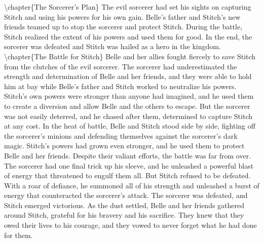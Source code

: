 \documentclass{book}%
\begin{document}
\textbackslash{}chapter\{The Sorcerer's Plan\}\newline%
\newline%
The evil sorcerer had set his sights on capturing Stitch and using his powers for his own gain. Belle's father and Stitch's new friends teamed up to stop the sorcerer and protect Stitch. During the battle, Stitch realized the extent of his powers and used them for good. In the end, the sorcerer was defeated and Stitch was hailed as a hero in the kingdom.%
\textbackslash{}chapter\{The Battle for Stitch\}\newline%
\newline%
Belle and her allies fought fiercely to save Stitch from the clutches of the evil sorcerer. The sorcerer had underestimated the strength and determination of Belle and her friends, and they were able to hold him at bay while Belle's father and Stitch worked to neutralize his powers.\newline%
\newline%
Stitch's own powers were stronger than anyone had imagined, and he used them to create a diversion and allow Belle and the others to escape. But the sorcerer was not easily deterred, and he chased after them, determined to capture Stitch at any cost.\newline%
\newline%
In the heat of battle, Belle and Stitch stood side by side, fighting off the sorcerer's minions and defending themselves against the sorcerer's dark magic. Stitch's powers had grown even stronger, and he used them to protect Belle and her friends.\newline%
\newline%
Despite their valiant efforts, the battle was far from over. The sorcerer had one final trick up his sleeve, and he unleashed a powerful blast of energy that threatened to engulf them all.\newline%
\newline%
But Stitch refused to be defeated. With a roar of defiance, he summoned all of his strength and unleashed a burst of energy that counteracted the sorcerer's attack. The sorcerer was defeated, and Stitch emerged victorious.\newline%
\newline%
As the dust settled, Belle and her friends gathered around Stitch, grateful for his bravery and his sacrifice. They knew that they owed their lives to his courage, and they vowed to never forget what he had done for them.\newline%
\end{document}
